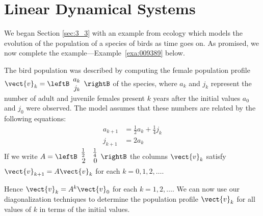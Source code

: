 \section{Linear Dynamical Systems}
\label{sec:3_5}

We began Section \ref{sec:3_3} with an example from ecology which models the evolution of the 
population of a species of birds as time goes on. As promised, we now 
complete the example---Example~\ref{exa:009389} below.


The bird population was described by computing the female population profile $\vect{v}_k = \leftB \begin{array}{r}
a_k \\
j_k
\end{array}\rightB$
 of the species, where $a_{k}$ and $j_{k}$ represent the number of adult and juvenile females present $k$ years after the initial values $a_{0}$ and $j_{0}$ were observed. The model assumes that these numbers are related by the following equations:
\begin{align*}
a_{k+1} &= \frac{1}{2} a_k + \frac{1}{4}j_k \\
j_{k+1} &= 2a_k
\end{align*}
If we write $A = \leftB \begin{array}{rr}
\frac{1}{2} & \frac{1}{4} \\
2 & 0 
\end{array}\rightB$
 the columns $\vect{v}_{k}$ satisfy $\vect{v}_{k+1} = A\vect{v}_{k}$ for each $k = 0, 1, 2, \dots$.

\noindent Hence $\vect{v}_{k} = A^{k}\vect{v}_{0}$ for each $k = 1, 2, \dots$. We can now use our diagonalization techniques to determine the population profile $\vect{v}_{k}$ for all values of $k$ in terms of the initial values.


